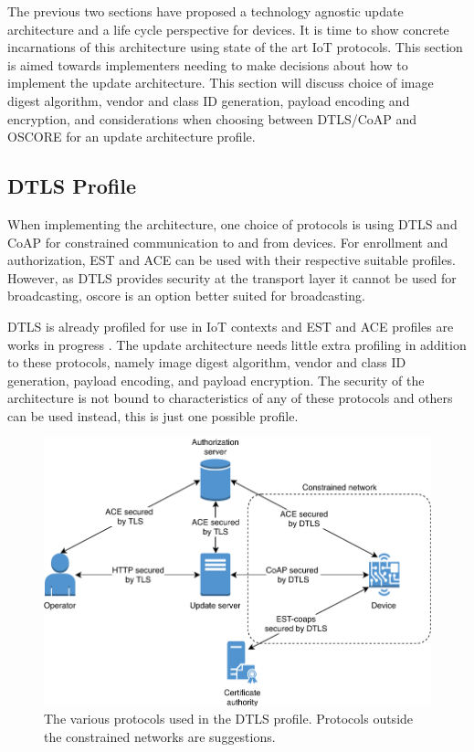 \documentclass[0-thesis.tex]{subfiles}
\begin{document}
\label{chap:profiles}
The previous two sections have proposed a technology agnostic update architecture and a
life cycle perspective for devices. It is time to show concrete incarnations of this
architecture using state of the art IoT protocols. This section is aimed towards
implementers needing to make decisions about how to implement the update architecture.
This section will discuss choice of image digest algorithm, vendor and class ID
generation, payload encoding and encryption, and considerations when choosing between
DTLS/CoAP and OSCORE for an update architecture profile.

\subsection{DTLS Profile}
\label{sec:dtls-profile}
When implementing the architecture, one choice of protocols is using DTLS and CoAP for
constrained communication to and from devices. For enrollment and authorization, EST and
ACE can be used with their respective suitable profiles. However, as DTLS provides
security at the transport layer it cannot be used for broadcasting, \gls{oscore} is an
option better suited for broadcasting. 

DTLS is already profiled for use in IoT contexts and EST and ACE profiles are works in
progress \parencite{rfc7925, est-coaps, ace-dtls-profile}. The update architecture needs
little extra profiling in addition to these protocols, namely image digest algorithm,
vendor and class ID generation, payload encoding, and payload encryption. The security of
the architecture is not bound to characteristics of any of these protocols and others can
be used instead, this is just one possible profile.

\begin{figure}
    \caption{The various protocols used in the DTLS profile. Protocols outside the constrained networks are suggestions.}
    \label{fig:dtls-profile}
    \includegraphics{images/dtls-profile.pdf}
\end{figure}
\end{document}
